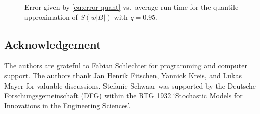 \documentclass[a4paper]{amsart}
\theoremstyle{definition}
\theoremstyle{plain}
\begin{document}
\begin{figure}[htb]
	\caption{Error given by \eqref{eq:error-quant} vs.\ average run-time
		for the quantile approximation of $S(w|B|)$ with $q=0.95$.}
	\label{fig:quant:1}
\end{figure}


\subsection*{Acknowledgement}

The authors are grateful to
Fabian Schlechter for programming and computer support.
The authors thank
Jan Henrik Fitschen,
Yannick Kreis,
and
Lukas Mayer
for valuable discussions.
Stefanie Schwaar was supported by the Deutsche Forschungsgemeinschaft
(DFG) within the RTG 1932
`Stochastic Models for Innovations in the Engineering Sciences'.



\end{document}
